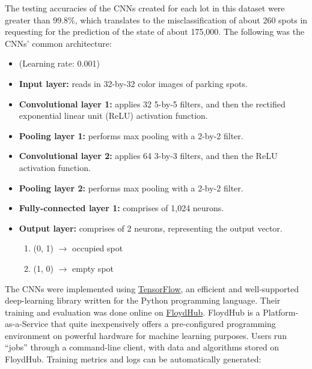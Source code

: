 \documentclass[a4paper, 11pt]{article} %
\begin{document}
	\hspace*{-6mm}The testing accuracies of the CNNs created for each lot in this dataset were greater 
	than 99.8\%, which translates to the misclassification of about 260 spots in requesting for the 
	prediction of the state of about 175,000. The following was the CNNs' 
	common architecture:
	\newpage
	\begin{itemize}
		\setlength\itemsep{-3mm}
		\item[] (Learning rate: 0.001)
		\item[] \textbf{Input layer:} reads in 32-by-32 color images of parking 
		spots.
		\item[] \textbf{Convolutional layer 1:} applies 32 5-by-5 filters, and 
		then the 
		rectified exponential linear unit (ReLU) activation function.
		\item[] \textbf{Pooling layer 1:} performs max pooling with a 2-by-2 
		filter.
		\item[] \textbf{Convolutional layer 2:} applies 64 3-by-3 filters, and 
		then the 
		ReLU activation function.
		\item[] \textbf{Pooling layer 2:} performs max pooling with a 2-by-2 
		filter.
		\item[] \textbf{Fully-connected layer 1:} comprises of 1,024 neurons.
		\item[] \textbf{Output layer:} comprises of 2 neurons, representing the 
		output vector.
		\vspace*{-4mm}
		\begin{enumerate}
			\setlength\itemsep{-3mm}
			\item[] (0, 1) $\rightarrow$ occupied spot
			\item[] (1, 0) $\rightarrow$ empty spot
		\end{enumerate}
	\end{itemize}
   	The CNNs were implemented using 
   	\href{https://www.tensorflow.org}{TensorFlow}, an efficient and 
   	well-supported deep-learning library written for the Python programming 
   	language. Their training and 
   	evaluation was done online on 
   	\href{https://www.floydhub.com}{FloydHub}. FloydHub is a 
   	Platform-as-a-Service that quite inexpensively offers a pre-configured programming environment on 
   	powerful hardware for machine learning purposes. Users run ``jobs'' through 
   	a command-line client, 
   	with data and algorithms stored on FloydHub. Training metrics and logs can 
   	be automatically 
    generated:
    \vskip 5mm
\end{document}
